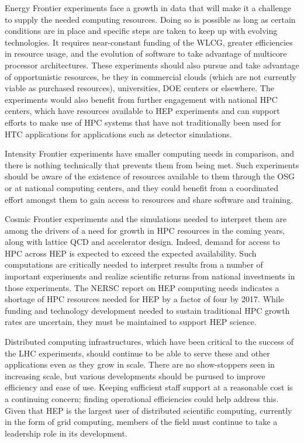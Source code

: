 Energy Frontier experiments face a growth in data that will make it a challenge to supply the needed computing resources.  Doing so is possible as long as certain conditions are in place and specific steps are taken to keep up with evolving technologies.  It requires near-constant funding of the WLCG, greater efficiencies in resource usage, and the evolution of software to take advantage of multicore processor architectures.  These experiments should also pursue and take advantage of opportunistic resources, be they in commercial clouds (which are not currently viable as purchased resources), universities, DOE centers or elsewhere.  The experiments would also benefit from further engagement with national HPC centers, which have resources available to HEP experiments and can support efforts to make use of HPC systems that have not traditionally been used for HTC applications for applications such as detector simulations.

Intensity Frontier experiments have smaller computing needs in comparison, and there is nothing technically that prevents them from being met.  Such experiments should be aware of the existence of resources available to them through the OSG or at national computing centers, and they could benefit from a coordinated effort amongst them to gain access to resources and share software and training.

Cosmic Frontier experiments and the simulations needed to interpret them are among the drivers of a need for growth in HPC resources in the coming years, along with lattice QCD and accelerator design.  Indeed, demand for access to HPC across HEP is expected to exceed the expected availability.  
Such computations are critically needed to interpret results from a number of important experiments and realize scientific returns from national investments in those experiments.  The NERSC report on HEP computing needs indicates a shortage of HPC resources needed for HEP by a factor of four by 2017.  While funding and technology development needed to sustain traditional HPC growth rates are uncertain, they must be maintained to support HEP science.

Distributed computing infrastructures, which have been critical to the success of the LHC experiments, should continue to be able to serve these and other applications even as they grow in scale.  There are no show-stoppers seen in increasing scale, but various developments should be purused to improve efficiency and ease of use.  Keeping sufficient staff support at a reasonable cost is a continuing concern; finding operational efficiencies could help address this.  Given that HEP is the largest user of distributed scientific computing, currently in the form of grid computing, members of the field must continue to take a leadership role in its development.

